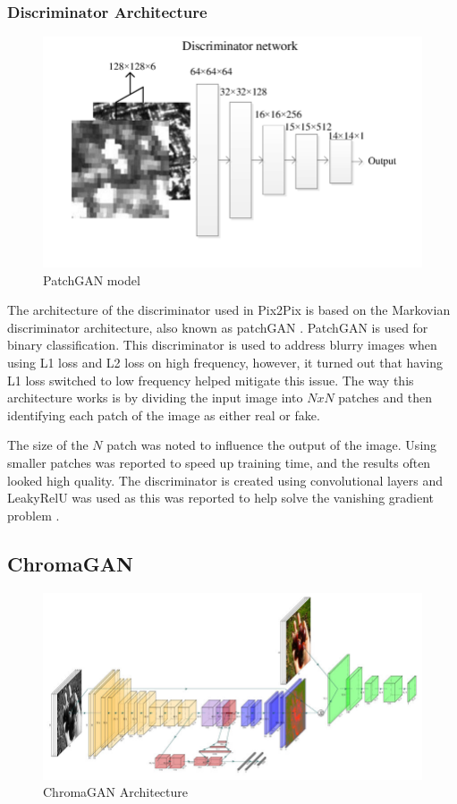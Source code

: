\subsubsection*{Discriminator Architecture}
\begin{figure}[H]
    \centering
    \includegraphics[width=0.7\columnwidth]{sections/figures/PatchGAN.png}
    \caption{PatchGAN model \cite{ao_2018}}
    \label{fig:my_label}
\end{figure}
The architecture of the discriminator used in Pix2Pix is based on the Markovian discriminator architecture, also known as patchGAN \cite{etal_2018}. PatchGAN is used for binary classification. This discriminator is used to address blurry images when using L1 loss and L2 loss on high frequency, however, it turned out that having L1 loss switched to low frequency helped mitigate this issue. The way this architecture works is by dividing the input image into \(N x N\) patches and then identifying each patch of the image as either real or fake. 

The size of the \(N\) patch was noted to influence the output of the image. Using smaller patches was reported to speed up training time, and the results often looked high quality. 
The discriminator is created using convolutional layers and LeakyRelU was used as this was reported to help solve the vanishing gradient problem \cite{brownlee_2020}. 





\newpage
\subsection{ChromaGAN}

\begin{figure}[H]
    \centering
    \includegraphics[width=1\columnwidth]{sections/figures/ChromaGAN_architecture.png}
    \caption{ChromaGAN Architecture}
    \label{fig:my_label}
\end{figure}

